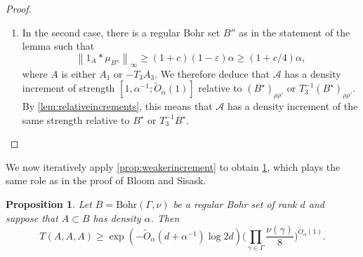 \documentclass{daj}
\newtheorem{proposition}[theorem]{Proposition}
\theoremstyle{definition}
\newcommand{\eps}{\varepsilon}
\newcommand{\m}[1]{\mu_{#1}}
\newcommand{\norm}[1]{\left\|#1\right\|}
\newcommand{\A}{\ensuremath{\mathcal{A}}}
\begin{document}
\begin{proof}
\begin{enumerate}
	\item In the second case, there is a regular Bohr set $B''$ as in the statement of the lemma such that 
        \begin{equation}
        \label{eq:epsilonchoice}
        \norm{1_{A} * \m{B''}}_{\infty} \geq (1+c)(1-\eps) \alpha \geq (1+c/4)\alpha,
        \end{equation}
        where $A$ is either $A_1$ or $-T_3A_3$. We therefore deduce that $\A$ has a density increment of strength $[1, \alpha^{-1}; \tilde{O}_{\alpha}(1)]$ relative to $(B^{\star})_{\rho\rho'}$ or $T_3^{-1}(B^{\star})_{\rho\rho'}$. By \cref{lem:relativeincrements}, this means that $\A$ has a density increment of the same strength relative to $B^{\star}$ or $T_3^{-1}B^{\star}$.\qedhere
\end{enumerate}
\end{proof}

We now iteratively apply \cref{prop:weakerincrement} to obtain \cref{thm:weakerbound}, which plays the same role as \cite[Theorem~5.4]{BS} in the proof of Bloom and Sisask.

\begin{proposition}
\label{thm:weakerbound}
Let $B = \mathrm{Bohr}(\Gamma, \nu)$ be a regular Bohr set of rank $d$ and suppose that $A\subset B$ has density $\alpha$. Then
\begin{equation*}
T(A, A, A) \geq \exp \left(-\tilde{O}_{\alpha}(d + \alpha^{-1}) \log{2d}\right)\Bigg( \prod_{\gamma\in \Gamma}\frac{\nu(\gamma)}{8}\Bigg)^{\tilde{O}_{\alpha}(1)}.
\end{equation*}
\end{proposition}
\end{document}
